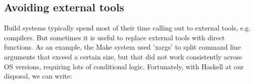 

%
%
%
%

\subsection{Avoiding external tools\label{sec:real_code}}

Build systems typically spend most of their time calling out to external
tools, e.g. compilers. But sometimes it is useful to replace external tools
with direct functions. As an example, the Make system used \lst'xargs' to
split command line arguments that exceed a certain size, but that did not work
consistently across OS versions, requiring lots of conditional logic.
Fortunately, with Haskell at our disposal, we can write:

